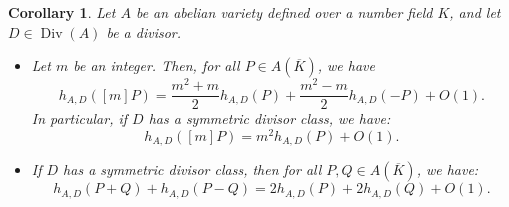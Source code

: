 \documentclass[a4paper, 12pt]{amsart}
\theoremstyle{definition}
\theoremstyle{plain}
\theoremstyle{plain}
\theoremstyle{plain}
\theoremstyle{plain}
\newtheorem{corollary0}[defn0]{Corollary}
\theoremstyle{remark}
\theoremstyle{remark}
\theoremstyle{plain}
\newenvironment{corollary}{ \begin{corollary0}}{\end{corollary0}}
\DeclareMathOperator{\Div}{Div}
\begin{document}
	\begin{corollary}\label{mumfordheight}
		Let $A$ be an abelian variety defined over a number field $K$, and let $D\in\Div(A)$ be a divisor.
		\begin{itemize}
			\item[(a)] Let $m$ be an integer. Then, for all $P\in A(\overline{K})$, we have
			\begin{equation*}
				h_{A,D}([m]P)=\frac{m^2+m}{2}h_{A,D}(P)+\frac{m^2-m}{2}h_{A,D}(-P)+O(1).
			\end{equation*}
			In particular, if $D$ has a symmetric divisor class, we have:
			\begin{equation*}
				h_{A,D}([m]P)=m^2h_{A,D}(P)+O(1).
			\end{equation*}
			\item[(b)] If $D$ has a symmetric divisor class, then for all $P,Q\in A(\overline{K})$, we have:
			\begin{equation*}
				h_{A,D}(P+Q)+h_{A,D}(P-Q)=2h_{A,D}(P)+2h_{A,D}(Q)+O(1).
			\end{equation*}
		\end{itemize}
	\end{corollary}
\end{document}
